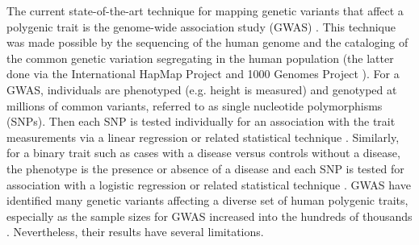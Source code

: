 The current state-of-the-art technique for mapping genetic variants
that affect a polygenic trait is the genome-wide association study
(GWAS) \citep{Hirschhorn2005}. This technique was made possible by the sequencing of the
human genome \citep{Lander2001, Venter2001, HGP2004, Lander2011} and the cataloging of the common genetic variation
segregating in the human population (the latter done via the
International HapMap Project \citep{HapMap2005, HapMap2007, HapMap2010} and 1000 Genomes Project \citep{1KG2010, 1KG2012}). For a GWAS, individuals are phenotyped
(e.g. height is measured) and genotyped at millions of common variants, referred to as single
nucleotide polymorphisms (SNPs).  Then each SNP is tested individually
for an association with the trait measurements via a linear regression
or related statistical technique \citep{Balding2006, Stephens2009, Yang2014}. Similarly, for a binary trait such
as cases with a disease versus controls without a disease, the
phenotype is the presence or absence of a disease and each SNP is
tested for association with a logistic regression or related
statistical technique \citep{Chang2015}. GWAS have identified many genetic variants
affecting a diverse set of human polygenic traits, especially as the
sample sizes for GWAS increased into the hundreds of
thousands \citep{Welter2014}. Nevertheless, their results have several limitations.

